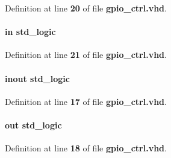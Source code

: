 Definition at line {\bf 20} of file {\bf gpio\+\_\+ctrl.\+vhd}.

\paragraph[{dir\+\_\+1}]{ {\bfseries \textcolor{keywordflow}{in}\textcolor{vhdlchar}{ }} {\bfseries \textcolor{comment}{std\+\_\+logic}\textcolor{vhdlchar}{ }} \hspace{0.3cm}{\ttfamily [Port]}}\label{classgpio__ctrl_ac97fcc6e9120fecaa24c149c0c1c54e3}


Definition at line {\bf 21} of file {\bf gpio\+\_\+ctrl.\+vhd}.

\paragraph[{gpio}]{ {\bfseries \textcolor{keywordflow}{inout}\textcolor{vhdlchar}{ }} {\bfseries \textcolor{comment}{std\+\_\+logic}\textcolor{vhdlchar}{ }} \hspace{0.3cm}{\ttfamily [Port]}}\label{classgpio__ctrl_a4e2a5d8b47de13fb442240ef7b680e7b}


Definition at line {\bf 17} of file {\bf gpio\+\_\+ctrl.\+vhd}.

\paragraph[{gpio\+\_\+in}]{ {\bfseries \textcolor{keywordflow}{out}\textcolor{vhdlchar}{ }} {\bfseries \textcolor{comment}{std\+\_\+logic}\textcolor{vhdlchar}{ }} \hspace{0.3cm}{\ttfamily [Port]}}\label{classgpio__ctrl_a5786b3a1e391f3adc69375e0ea708dce}


Definition at line {\bf 18} of file {\bf gpio\+\_\+ctrl.\+vhd}.

\paragraph[{ieee}]{\hspace{0.3cm}{\ttfamily [Library]}}\label{classgpio__ctrl_a0a6af6eef40212dbaf130d57ce711256}


